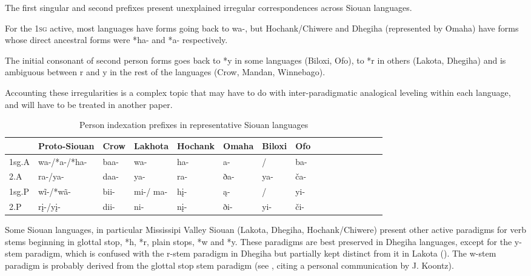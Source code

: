\documentclass[oneside,a4paper,11pt]{article}
\newcommand{\ipa}[1]{{\phon#1}} %
\begin{document}
The first singular and second prefixes present unexplained irregular correspondences across Siouan languages. 

For the \textsc{1sg} active, most languages have forms going back to \ipa{*wa-}, but Hochank/Chiwere and Dhegiha (represented by Omaha) have forms whose direct ancestral forms were *\ipa{ha-} and *\ipa{a-} respectively. 

The initial consonant of second person forms goes back to *\ipa{y} in some languages (Biloxi, Ofo), to *\ipa{r} in others (Lakota, Dhegiha) and is ambiguous between \ipa{*r} and \ipa{*y} in the rest of the languages (Crow, Mandan, Winnebago).

Accounting these irregularities is a complex topic that may have to do with inter-paradigmatic analogical leveling within each language, and will have to be treated in another paper.

\begin{table}[H]
\caption{Person indexation prefixes in representative Siouan languages} \label{tab:siouan}
\begin{tabular}{llllllllllllllll}
\toprule
 & 	Proto-Siouan & 	Crow & 	Lakhota & 	Hochank & 	Omaha & 	Biloxi & 	Ofo & 	\\
 \midrule
1sg.A & 	\ipa{*wa-/*a-/*ha-} & 	\ipa{baa-} & 	\ipa{wa-} & 	\ipa{ha-} & 	\ipa{a-} & 	\ipa{/} & 	\ipa{ba-} & 	\\
2.A & 	\ipa{*ra-/ya-} & 	\ipa{daa-} & 	\ipa{ya-} & 	\ipa{ra-} & 	\ipa{ða-} & 	\ipa{ya-} & 	\ipa{ča- } & 	\\
1sg.P & 	\ipa{*wĩ-/*wã-} & 	\ipa{bii-} & 	\ipa{mi-/
ma-} & 	\ipa{hį-} & 	\ipa{ą-} & 	\ipa{/} & 	\ipa{yi-} & 	\\
2.P & 	\ipa{*rį-/yį-} & 	\ipa{dii-} & 	\ipa{ni-} & 	\ipa{nį-} & 	\ipa{ði-} & 	\ipa{yi-} & 	\ipa{či-} & 	\\
\bottomrule
\end{tabular}
\end{table}

Some Siouan languages, in particular Mississipi Valley Siouan (Lakota, Dhegiha, Hochank/Chiwere) present other active paradigms for verb stems beginning in glottal stop, *\ipa{h}, *\ipa{r}, plain stops, *\ipa{w} and *\ipa{y}. These paradigms are best preserved in Dhegiha languages, except for the y-stem paradigm, which is confused with the r-stem paradigm in Dhegiha but partially kept distinct from it in Lakota (\citealt{jacques16ebde}). The w-stem paradigm is probably derived from the glottal stop stem paradigm (see \citealt[496]{rankin05quapaw}, citing a personal communication by J. Koontz).
\end{document}
